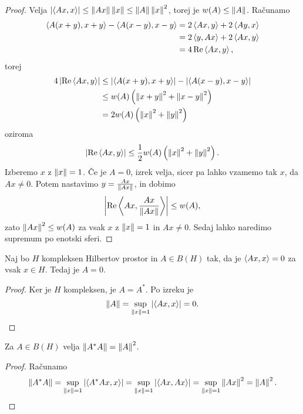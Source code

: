 \begin{proof}
  Velja $\left| \left< Ax,x \right> \right| \le \left\lVert Ax\right\rVert \left\lVert x\right\rVert \le \left\lVert A\right\rVert \left\lVert x\right\rVert^2$, torej
  je $w(A) \le \left\lVert A\right\rVert$.
  Računamo
  \begin{align*}
	\left< A(x+y), x+y \right> - \left< A(x-y), x-y \right>
	&= 2 \left< Ax,y \right> + 2 \left< Ay,x \right> \\
	&= 2 \left< y,Ax \right> + 2 \left< Ax,y \right> \\
	&= 4 \operatorname{Re} \left< Ax,y \right>,
  \end{align*}
  torej
  \begin{align*}
	4 \left| \operatorname{Re} \left< Ax,y \right> \right|
	&\le \left| \left< A(x+y), x+y \right> \right| - \left| \left< A(x-y), x-y \right> \right| \\
	&\le w(A) \left( \left\lVert x+y\right\rVert^2 + \left\lVert x-y\right\rVert^2 \right) \\
	&= 2 w(A) \left( \left\lVert x\right\rVert^2 + \left\lVert y\right\rVert^2 \right)
  \end{align*}
  oziroma
  \[
	\left| \operatorname{Re} \left< Ax,y \right> \right| \le \frac{1}{2} w(A) \left( \left\lVert x\right\rVert^2 + \left\lVert y\right\rVert^2 \right).
  \]
  Izberemo $x$ z $\left\lVert x\right\rVert = 1$.
  Če je $A = 0$, izrek velja, sicer pa lahko vzamemo tak $x$, da $Ax \ne 0$.
  Potem nastavimo $y = \frac{Ax}{\left\lVert Ax\right\rVert}$, in dobimo
  \[
	\left| \operatorname{Re} \left< Ax, \frac{Ax}{\left\lVert Ax\right\rVert} \right> \right| \le w(A),
  \]
  zato $\left\lVert Ax\right\rVert^2 \le w(A)$ za vsak $x$ z $\left\lVert x\right\rVert = 1$ in $Ax \ne 0$.
  Sedaj lahko naredimo supremum po enotski sferi.
\end{proof}


\begin{trditev}
  Naj bo $H$ kompleksen Hilbertov prostor in $A \in B(H)$ tak, da je $\left< Ax,x \right>
  = 0$ za vsak $x \in H$.
  Tedaj je $A = 0$.
\end{trditev}

\begin{proof}
  Ker je $H$ kompleksen, je $A = A^*$.
  Po izreku je
  \[
	\left\lVert A\right\rVert = \sup_{\left\lVert x\right\rVert = 1} \left| \left< Ax,x \right> \right| = 0.
	\qedhere
  \]
\end{proof}

\begin{izrek}
  Za $A \in B(H)$ velja $\left\lVert A^* A\right\rVert = \left\lVert A\right\rVert^2$.
\end{izrek}

\begin{proof}
  Računamo
  \[
	\left\lVert A^* A\right\rVert
	= \sup_{\left\lVert x\right\rVert = 1} \left| \left< A^* Ax, x \right> \right|
	= \sup_{\left\lVert x\right\rVert = 1} \left| \left< Ax, Ax \right> \right|
	= \sup_{\left\lVert x\right\rVert = 1} \left\lVert Ax\right\rVert^2
	= \left\lVert A\right\rVert^2.
	\qedhere
  \]
\end{proof}

